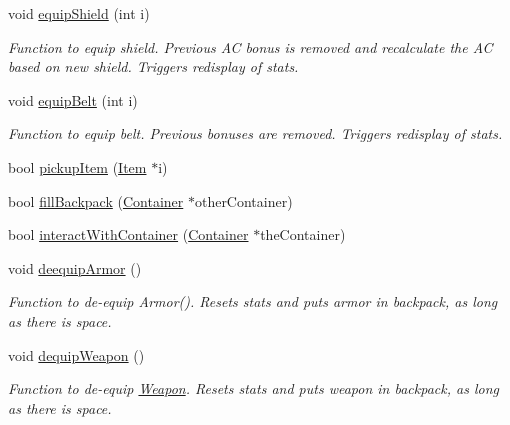 \begin{DoxyCompactItemize}
\hypertarget{class_fighter_af314de4ade8520638065735f2ebd3fc8}{}\label{class_fighter_af314de4ade8520638065735f2ebd3fc8} 
void \hyperlink{class_fighter_af314de4ade8520638065735f2ebd3fc8}{equip\+Shield} (int i)
\begin{DoxyCompactList}\small\item\em Function to equip shield. Previous AC bonus is removed and recalculate the AC based on new shield. Triggers redisplay of stats. \end{DoxyCompactList}\item 
\hypertarget{class_fighter_aed08492ff6120638f476309a50887841}{}\label{class_fighter_aed08492ff6120638f476309a50887841} 
void \hyperlink{class_fighter_aed08492ff6120638f476309a50887841}{equip\+Belt} (int i)
\begin{DoxyCompactList}\small\item\em Function to equip belt. Previous bonuses are removed. Triggers redisplay of stats. \end{DoxyCompactList}\item 
bool \hyperlink{class_fighter_a69dccfbc61abf5720e8a329203158d1e}{pickup\+Item} (\hyperlink{class_item}{Item} $\ast$i)
\item 
bool \hyperlink{class_fighter_a572fb61d329f4993701900ff3a1db5f8}{fill\+Backpack} (\hyperlink{class_container}{Container} $\ast$other\+Container)
\item 
bool \hyperlink{class_fighter_a66c0adfa4979fa3ac994359a188121a8}{interact\+With\+Container} (\hyperlink{class_container}{Container} $\ast$the\+Container)
\item 
\hypertarget{class_fighter_ac7a95f5d4b59bca227f847924625ffc2}{}\label{class_fighter_ac7a95f5d4b59bca227f847924625ffc2} 
void \hyperlink{class_fighter_ac7a95f5d4b59bca227f847924625ffc2}{deequip\+Armor} ()
\begin{DoxyCompactList}\small\item\em Function to de-\/equip Armor(). Resets stats and puts armor in backpack, as long as there is space. \end{DoxyCompactList}\item 
\hypertarget{class_fighter_a277fd0526a0318923f2775356f30972f}{}\label{class_fighter_a277fd0526a0318923f2775356f30972f} 
void \hyperlink{class_fighter_a277fd0526a0318923f2775356f30972f}{dequip\+Weapon} ()
\begin{DoxyCompactList}\small\item\em Function to de-\/equip \hyperlink{class_weapon}{Weapon}. Resets stats and puts weapon in backpack, as long as there is space. \end{DoxyCompactList}\item 

\end{DoxyCompactItemize}
